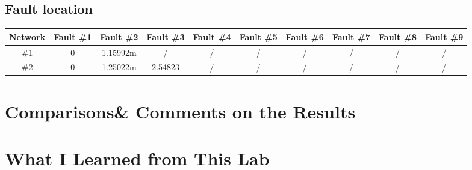 \documentclass[11pt,oneside,a4paper]{report}
\begin{document}
\subsection*{Fault location}
\begin{table}[htbp]
\begin{tabular}{cccccccccc}
\toprule
Network & Fault \#1 & Fault \#2 & Fault \#3 & Fault \#4 & Fault \#5 & Fault \#6 & Fault \#7 & Fault \#8 & Fault \#9 \\
\midrule
\#1 & 0 & 1.15992m & / & / & / & / & / & / & / \\
\#2 & 0 & 1.25022m & 2.54823 & / & / & / & / & / & / \\
\bottomrule
\end{tabular}
\end{table}

\section*{Comparisons\& Comments on the Results}

\section*{What I Learned from This Lab}
\end{document}
